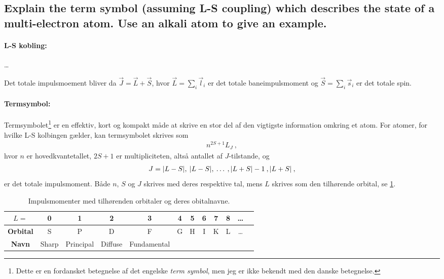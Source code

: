 \subsection{Explain the term symbol (assuming L-S coupling) which describes the state of a multi-electron atom. Use an alkali atom to give an example.}


\paragraph{L-S kobling:} \ldots

Det totale impulsmoement bliver da $\Vec{J} = \Vec{L} + \Vec{S}$, hvor $\Vec{L} = \sum_i \Vec{l}_i$ er det totale baneimpulsmoment og $\Vec{S} = \sum_i \Vec{s}_i$ er det totale spin.

\paragraph{Termsymbol:} Termsymbolet\footnote{Dette er en fordansket betegnelse af det engelske \emph{term symbol}, men jeg er ikke bekendt med den danske betegnelse.} er en effektiv, kort og kompakt måde at skrive en stor del af den vigtigste information omkring et atom. For atomer, for hvilke L-S kolbingen gælder, kan termsymbolet skrives som
\begin{align}
    n^{2S+1}L_J \: ,
\end{align}
hvor $n$ er hovedkvantetallet, $2S+1$ er multipliciteten, altså antallet af $J$-tilstande, og
\begin{align}
    J = \abs{L - S}, \: \abs{L - S}, \: \ldots \: , \abs{L + S} - 1 \: , \abs{L + S} \: , 
\end{align}
er det totale impulsmoment. Både $n$, $S$ og $J$ skrives med deres respektive tal, mens $L$ skrives som den tilhørende orbital, se \cref{tab:Q14_ImpulsmomenterOrbitalerOgDeresNavne}.
\begin{table}[!h]
    \centering
    \begin{tabular}{|c|c|c|c|c|c|c|c|c|c|c|c|}
        \hline
        $L=$ & 0 & 1 & 2 & 3 & 4 & 5 & 6 & 7 & 8 & \ldots\\
        \hline
        \textbf{Orbital} & S & P & D & F & G & H & I & K & L & \ldots \\
        \hline
        \textbf{Navn} & Sharp & Principal & Diffuse & Fundamental & & & & & &\\
        \hline
    \end{tabular}
    \caption{Impulsmomenter med tilhørenden orbitaler og deres obitalnavne.}
    \label{tab:Q14_ImpulsmomenterOrbitalerOgDeresNavne}
\end{table}

